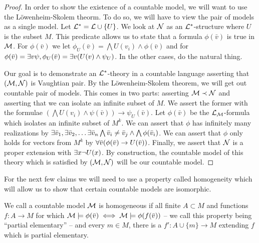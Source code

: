 \begin{proof}\label{proof_countable_vaughtian_pairs}
In order to show the existence of a countable model, we will want to use the L\"owenheim-Skolem theorm.
To do so, we will have to view the pair of models as a single model. 
Let  \(\mathcal{L}^* = \mathcal{L} \cup \{U\}\). 
We look at \(\mathcal{N}\) as an \(\mathcal{L}^*\)-structure where \(U\) is the subset \(M\). 
This predicate allows us to state that a formula \(\phi(\bar{v})\) is true in \(\mathcal{M}\).
For \(\phi(\bar{v})\) \qf we let \(\phi_U(\bar{v}) = \bigwedge U(v_i) \land \phi(\bar{v})\) and for \(\phi(\bar{v}) = \exists v \psi, \phi_U(\bar{v}) = \exists v (U(v) \land \psi_U)\). 
In the other cases, do the natural thing. %

Our goal is to demonstrate an \(\mathcal{L}^*\)-theory in a countable language asserting that \((\mathcal{M}, \mathcal{N})\) is Vaughtian pair.
By the L\"owenheim-Skolem theorem, we will get out countable pair of models.
This comes in two parts: asserting \(\mathcal{M} \prec \mathcal{N}\) and asserting that we can isolate an infinite subset of \(M\). 
We assert the former with the formulae \((\bigwedge U(v_i) \land \psi(\bar{v})) \to \psi_U(\bar{v})\). 
Let \(\phi(\bar{v})\) be the \(\mathcal{L}_{\mathcal{M}}\)-formula which isolates an infinite subset of \(M^k\). 
We can assert that \(\phi\) has infinitely many realizations by \(\exists \bar{v}_1, \exists \bar{v}_2, \ldots \exists \bar{v}_n \bigwedge \bar{v}_i \neq \bar{v}_j \land \bigwedge \phi(\bar{v}_i)\). %
We can assert that \(\phi\) only holds for vectors from \(M^k\) by \(\forall \bar{v} (\phi(\bar{v}) \to U(\bar{v}))\).
Finally, we assert that \(\mathcal{N}\) is a proper extension with \(\exists x \neg U(x)\). 
By construction, the countable model of this theory which is satisfied by \((\mathcal{M}, \mathcal{N})\) will be our countable model.
\end{proof}

For the next few claims we will need to use a property called homogeneity which will allow us to show that certain countable models are isomorphic.

\begin{definition}\label{definition_homogeneity}
We call a countable model \(\mathcal{M}\) is homogeneous if all finite \(A \subset M\) and functions \(f: A \to M\) for which \(\mathcal{M} \models \phi(\bar{v}) \iff \mathcal{M} \models \phi(f(\bar{v}))\) -- we call this property being ``partial elementary'' -- and every \(m \in M\), there is a \(f': A \cup \{m\} \to M\) extending \(f\) which is partial elementary. %
\end{definition}

